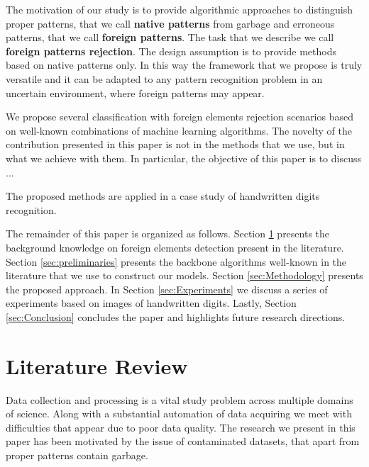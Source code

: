\documentclass{llncs}
\begin{document}
The motivation of our study is to provide algorithmic approaches to distinguish proper patterns, that we call \textbf{native patterns} from garbage and erroneous patterns, that we call \textbf{foreign patterns}. The task that we describe we call \textbf{foreign patterns rejection}. The design assumption is to provide methods based on native patterns only. In this way the framework that we propose is truly versatile and it can be adapted to any pattern recognition problem in an uncertain environment, where foreign patterns may appear. 

We propose several classification with foreign elements rejection scenarios based on well-known combinations of machine learning algorithms. The novelty of the contribution presented in this paper is not in the methods that we use, but in what we achieve with them. 
{\color{blue} In particular, the objective of this paper is to discuss ...}


The proposed methods are applied in a case study of handwritten digits recognition.

The remainder of this paper is organized as follows. Section \ref{sec:Literature Review} presents the background knowledge on foreign elements detection present in the literature. Section \ref{sec:preliminaries} presents the backbone algorithms well-known in the literature that we use to construct our models. Section \ref{sec:Methodology} presents the proposed approach. In Section \ref{sec:Experiments} we discuss a series of experiments based on images of handwritten digits. Lastly, Section \ref{sec:Conclusion} concludes the paper and highlights future research directions.


\section{Literature Review}
  \label{sec:Literature Review}

Data collection and processing is a vital study problem across multiple domains of science. Along with a substantial automation of data acquiring we meet with difficulties that appear due to poor data quality. The research we present in this paper has been motivated by the issue of contaminated datasets, that apart from proper patterns contain garbage.
\end{document}
